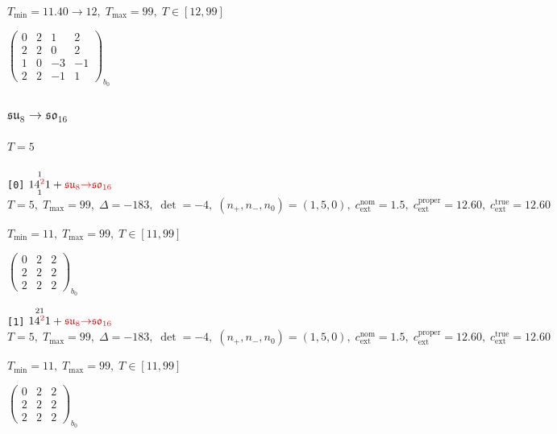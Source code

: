 \documentclass[10pt]{article}
\begin{document}
\hspace{1em}$T_{\min}=11.40\to 12,\;T_{\max}=99,\;T\in[12,99]$

\hspace{2em}$\left(\begin{smallmatrix}0 & 2 & 1 & 2 \\ 2 & 2 & 0 & 2 \\ 1 & 0 & -3 & -1 \\ 2 & 2 & -1 & 1\end{smallmatrix}\right)_{\!b_0}$


\subsubsection*{$\mathfrak{su}_8{\to}\mathfrak{so}_{16}$}

\paragraph{$T=5$}

\texttt{[0]} $1\overset{1}{\underset{1}{4^{\textcolor{red}{2}}}}1 + \textcolor{red}{\mathfrak{su}_8{\to}\mathfrak{so}_{16}}$ \quad $T=5,\;T_{\max}=99,\;\Delta=-183,\;\det=-4,\;(n_+,n_-,n_0)=(1,5,0),\;c_\mathrm{ext}^{\mathrm{nom}}=1.5,\;c_\mathrm{ext}^{\mathrm{proper}}=12.60,\;c_\mathrm{ext}^{\mathrm{true}}=12.60$

\hspace{1em}$T_{\min}=11,\;T_{\max}=99,\;T\in[11,99]$

\hspace{2em}$\left(\begin{smallmatrix}0 & 2 & 2 \\ 2 & 2 & 2 \\ 2 & 2 & 2\end{smallmatrix}\right)_{\!b_0}$

\texttt{[1]} $1\overset{21}{4^{\textcolor{red}{2}}}1 + \textcolor{red}{\mathfrak{su}_8{\to}\mathfrak{so}_{16}}$ \quad $T=5,\;T_{\max}=99,\;\Delta=-183,\;\det=-4,\;(n_+,n_-,n_0)=(1,5,0),\;c_\mathrm{ext}^{\mathrm{nom}}=1.5,\;c_\mathrm{ext}^{\mathrm{proper}}=12.60,\;c_\mathrm{ext}^{\mathrm{true}}=12.60$

\hspace{1em}$T_{\min}=11,\;T_{\max}=99,\;T\in[11,99]$

\hspace{2em}$\left(\begin{smallmatrix}0 & 2 & 2 \\ 2 & 2 & 2 \\ 2 & 2 & 2\end{smallmatrix}\right)_{\!b_0}$
\end{document}
